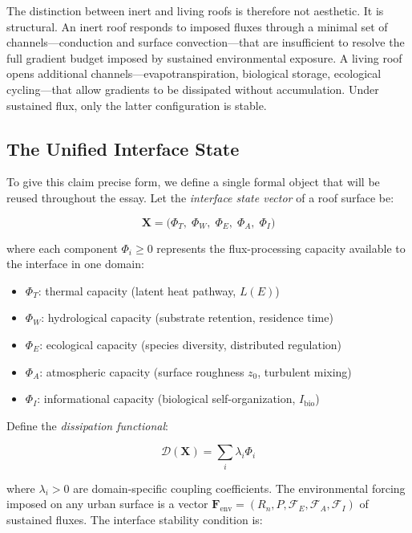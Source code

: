 \documentclass[12pt, a4paper]{article}
\theoremstyle{plain}
\theoremstyle{remark}
\begin{document}
The distinction between inert and living roofs is therefore not aesthetic. It is structural. An inert roof responds to imposed fluxes through a minimal set of channels---conduction and surface convection---that are insufficient to resolve the full gradient budget imposed by sustained environmental exposure. A living roof opens additional channels---evapotranspiration, biological storage, ecological cycling---that allow gradients to be dissipated without accumulation. Under sustained flux, only the latter configuration is stable.

\subsection{The Unified Interface State}

To give this claim precise form, we define a single formal object that will be reused throughout the essay. Let the \emph{interface state vector} of a roof surface be:

\begin{equation}
  \mathbf{X} = \bigl(\Phi_T,\;\Phi_W,\;\Phi_E,\;\Phi_A,\;\Phi_I\bigr)
  \label{eq:state_vector}
\end{equation}

\noindent where each component $\Phi_i \geq 0$ represents the flux-processing capacity available to the interface in one domain:

\begin{itemize}[leftmargin=2em, itemsep=0.1em]
  \item $\Phi_T$: thermal capacity (latent heat pathway, $L(E)$)
  \item $\Phi_W$: hydrological capacity (substrate retention, residence time)
  \item $\Phi_E$: ecological capacity (species diversity, distributed regulation)
  \item $\Phi_A$: atmospheric capacity (surface roughness $z_0$, turbulent mixing)
  \item $\Phi_I$: informational capacity (biological self-organization, $I_{\text{bio}}$)
\end{itemize}

\noindent Define the \emph{dissipation functional}:

\begin{equation}
  \mathcal{D}(\mathbf{X}) = \sum_{i} \lambda_i \Phi_i
  \label{eq:dissipation}
\end{equation}

\noindent where $\lambda_i > 0$ are domain-specific coupling coefficients. The environmental forcing imposed on any urban surface is a vector $\mathbf{F}_{\text{env}} = (R_n, P, \mathcal{F}_E, \mathcal{F}_A, \mathcal{F}_I)$ of sustained fluxes. The interface stability condition is:
\end{document}
